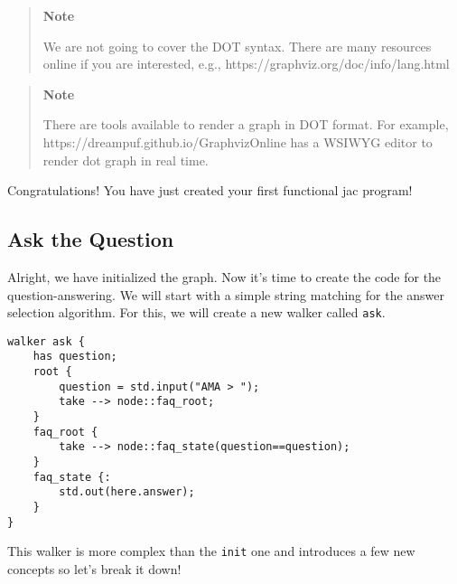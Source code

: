 \begin{quote}
\textbf{Note}

We are not going to cover the DOT syntax. There are many resources
online if you are interested, e.g.,
https://graphviz.org/doc/info/lang.html
\end{quote}

\begin{quote}
\textbf{Note}

There are tools available to render a graph in DOT format. For example,
https://dreampuf.github.io/GraphvizOnline has a WSIWYG editor to render
dot graph in real time.
\end{quote}

Congratulations! You have just created your first functional jac
program!

\hypertarget{ask-the-question}{%
\subsection{Ask the Question}\label{ask-the-question}}

Alright, we have initialized the graph. Now it's time to create the code
for the question-answering. We will start with a simple string matching
for the answer selection algorithm. For this, we will create a new
walker called \passthrough{\lstinline!ask!}.

\begin{lstlisting}
walker ask {
    has question;
    root {
        question = std.input("AMA > ");
        take --> node::faq_root;
    }
    faq_root {
        take --> node::faq_state(question==question);
    }
    faq_state {:
        std.out(here.answer);
    }
}
\end{lstlisting}

This walker is more complex than the \passthrough{\lstinline!init!} one
and introduces a few new concepts so let's break it down!

